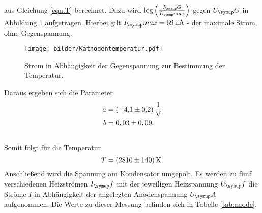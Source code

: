 aus Gleichung \eqref{eqn:T} berechnet.
Dazu wird $\log{\left(\frac{I_\su{G}}{I_\su{max}}\right)}$ gegen $U_\su{G}$ in Abbildung \ref{fig:g} aufgetragen.
Hierbei gilt $I_\su{max} = \SI{69}{\nano\ampere}$ - der maximale Strom, ohne Gegenspannung.
\begin{figure}[H]
  \centering
  \texttt{[image: bilder/Kathodentemperatur.pdf]}
  \caption{Strom in Abhängigkeit der Gegenspannung zur Bestimmung der Temperatur.}
  \label{fig:g}
\end{figure}
Daraus ergeben sich die Parameter
\begin{align}
  a &= \SI[per-mode=fraction]{-4,1\pm0,2}{\per\volt}\\ \notag
  b &= 0,03\pm0,09.\\ \notag
\end{align}
Somit folgt für die Temperatur
\begin{equation}
  T = \SI{2810\pm140}{\kelvin}. \notag
\end{equation}
Anschließend wird die Spannung am Kondensator umgepolt. Es werden zu fünf verschiedenen
Heizströmen $I_\su{f}$ mit der jeweiligen Heizspannung $U_\su{f}$ die Ströme $I$
in Abhängigkeit der angelegten Anodenspannung $U_\su{A}$ aufgenommen.
Die Werte zu dieser Messung befinden sich in Tabelle \ref{tab:anode}.
